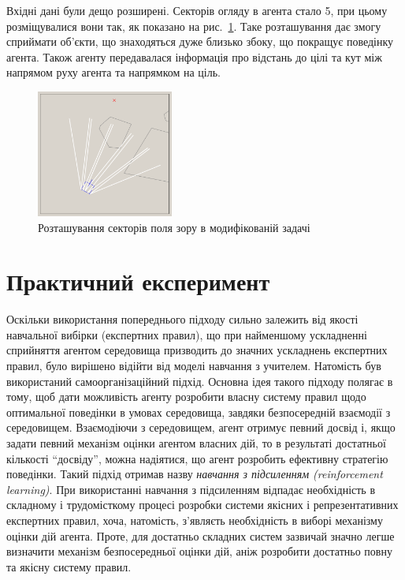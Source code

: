 \documentclass[a4paper,10pt,fleqn]{article}
\begin{document}
Вхідні дані були дещо розширені. Секторів огляду в агента стало 5, при цьому розміщувалися вони так, як показано на рис.~\ref{fig:tank-vis-area}. Таке розташування дає змогу сприймати об'єкти, що знаходяться дуже близько збоку, що покращує поведінку агента. Також агенту передавалася інформація про відстань до цілі та кут між напрямом руху агента та напрямком на ціль.
\begin{figure}
	\centering
	\includegraphics[width=0.4\textwidth]{tank-vis-area}
	\caption{Розташування секторів поля зору в модифікованій задачі}
	\label{fig:tank-vis-area}
\end{figure}

\section{Практичний експеримент}
Оскільки використання попереднього підходу сильно залежить від якості навчальної вибірки (експертних правил), що при найменшому ускладненні сприйняття агентом середовища призводить до значних ускладнень експертних правил, було вирішено відійти від моделі навчання з учителем. Натомість був використаний самоорганізаційний підхід. Основна ідея такого підходу полягає в тому, щоб дати можливість агенту розробити власну систему правил щодо оптимальної поведінки в умовах середовища, завдяки безпосередній взаємодії з середовищем. Взаємодіючи з середовищем, агент отримує певний досвід і, якщо задати певний механізм оцінки агентом власних дій, то в результаті достатньої кількості ``досвіду'', можна надіятися, що агент розробить ефективну стратегію поведінки. Такий підхід отримав назву \emph{навчання з підсиленням (reinforcement learning)}. При використанні навчання з підсиленням відпадає необхідність в складному і трудомісткому процесі розробки системи якісних і репрезентативних експертних правил, хоча, натомість, з'являєть необхідність в виборі механізму оцінки дій агента. Проте, для достатньо складних систем зазвичай значно легше визначити механізм безпосередньої оцінки дій, аніж розробити достатньо повну та якісну систему правил.
\end{document}
